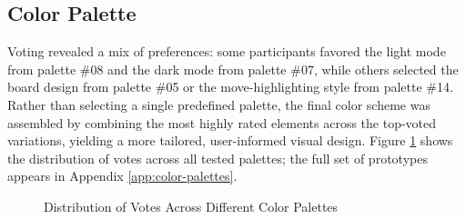 \subsection{Color Palette}
\label{subsec:results-color-palette}
Voting revealed a mix of preferences: some participants favored the light mode from palette \#08 and the dark mode from palette \#07, while others selected the board design from palette \#05 or the move-highlighting style from palette \#14. \\

Rather than selecting a single predefined palette, the final color scheme was assembled by combining the most highly rated elements across the top-voted variations, yielding a more tailored, user-informed visual design. Figure \ref{fig:color-palette-results} shows the distribution of votes across all tested palettes; the full set of prototypes appears in Appendix \ref{app:color-palettes}.

\begin{figure}[h!]
\centering
{}
\caption[Votes per color palette]{Distribution of Votes Across Different Color Palettes}
\label{fig:color-palette-results}
\end{figure}